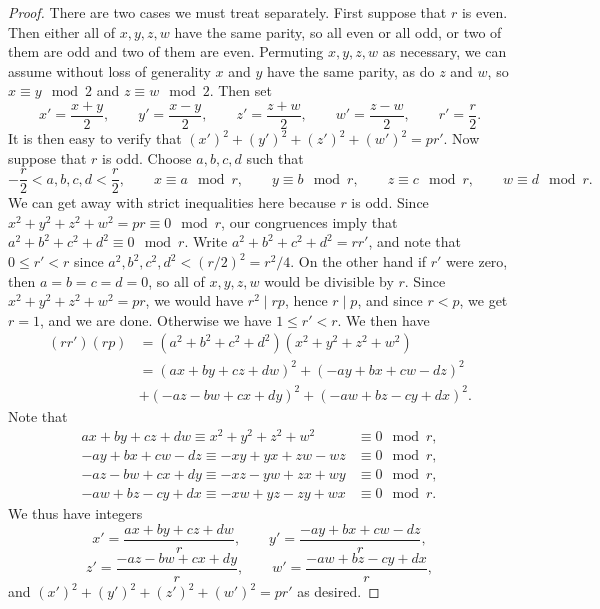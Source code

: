 \documentclass{article}
\newcommand{\rb}[1]{\left( #1 \right)}
\theoremstyle{definition}\newtheorem{definition}{Definition}
\theoremstyle{definition}\newtheorem{remark}[definition]{Remark}
\theoremstyle{definition}\newtheorem*{example}{Example}
\theoremstyle{definition}\newtheorem*{note}{Note}
\begin{document}
\begin{proof}
There are two cases we must treat separately. First suppose that $ r $ is even. Then either all of $ x, y, z, w $ have the same parity, so all even or all odd, or two of them are odd and two of them are even. Permuting $ x, y, z, w $ as necessary, we can assume without loss of generality $ x $ and $ y $ have the same parity, as do $ z $ and $ w $, so $ x \equiv y \mod 2 $ and $ z \equiv w \mod 2 $. Then set
$$ x' = \dfrac{x + y}{2}, \qquad y' = \dfrac{x - y}{2}, \qquad z' = \dfrac{z + w}{2}, \qquad w' = \dfrac{z - w}{2}, \qquad r' = \dfrac{r}{2}. $$
It is then easy to verify that $ \rb{x'}^2 + \rb{y'}^2 + \rb{z'}^2 + \rb{w'}^2 = pr' $. Now suppose that $ r $ is odd. Choose $ a, b, c, d $ such that
$$ -\dfrac{r}{2} < a, b, c, d < \dfrac{r}{2}, \qquad x \equiv a \mod r, \qquad y \equiv b \mod r, \qquad z \equiv c \mod r, \qquad w \equiv d \mod r. $$
We can get away with strict inequalities here because $ r $ is odd. Since $ x^2 + y^2 + z^2 + w^2 = pr \equiv 0 \mod r $, our congruences imply that $ a^2 + b^2 + c^2 + d^2 \equiv 0 \mod r $. Write $ a^2 + b^2 + c^2 + d^2 = rr' $, and note that $ 0 \le r' < r $ since $ a^2, b^2, c^2, d^2 < \rb{r / 2}^2 = r^2 / 4 $. On the other hand if $ r' $ were zero, then $ a = b = c = d = 0 $, so all of $ x, y, z, w $ would be divisible by $ r $. Since $ x^2 + y^2 + z^2 + w^2 = pr $, we would have $ r^2 \mid rp $, hence $ r \mid p $, and since $ r < p $, we get $ r = 1 $, and we are done. Otherwise we have $ 1 \le r' < r $. We then have
\begin{align*}
\rb{rr'}\rb{rp}
& = \rb{a^2 + b^2 + c^2 + d^2}\rb{x^2 + y^2 + z^2 + w^2} \\
& = \rb{ax + by + cz + dw}^2 + \rb{-ay + bx + cw - dz}^2 \\
& + \rb{-az - bw + cx + dy}^2 + \rb{-aw + bz - cy + dx}^2.
\end{align*}
Note that
\begin{align*}
ax + by + cz + dw \equiv x^2 + y^2 + z^2 + w^2 & \equiv 0 \mod r, \\
-ay + bx + cw - dz \equiv -xy + yx + zw - wz & \equiv 0 \mod r, \\
-az - bw + cx + dy \equiv -xz - yw + zx + wy & \equiv 0 \mod r, \\
-aw + bz - cy + dx \equiv -xw + yz - zy + wx & \equiv 0 \mod r.
\end{align*}
We thus have integers
$$ x' = \dfrac{ax + by + cz + dw}{r}, \qquad y' = \dfrac{-ay + bx + cw - dz}{r}, $$
$$ z' = \dfrac{-az - bw + cx + dy}{r}, \qquad w' = \dfrac{-aw + bz - cy + dx}{r}, $$
and $ \rb{x'}^2 + \rb{y'}^2 + \rb{z'}^2 + \rb{w'}^2 = pr' $ as desired.
\end{proof}
\end{document}
